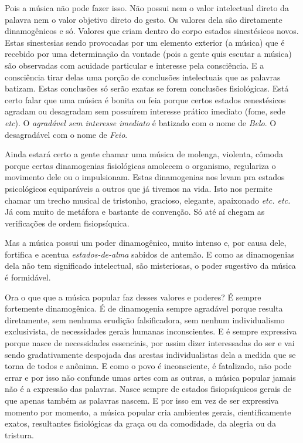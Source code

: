 Pois a música não pode fazer isso. Não possui nem o valor intelectual
direto da palavra nem o valor objetivo direto do gesto. Os valores dela
são diretamente dinamogênicos e só. Valores que criam dentro do corpo
estados sinestésicos novos. Estas sinestesias sendo provocadas por um
elemento exterior (a música) que é recebido por uma determinação da
vontade (pois a gente quis escutar a música) são observadas com acuidade
particular e interesse pela consciência. E a consciência tirar delas uma
porção de conclusões intelectuais que as palavras batizam. Estas
conclusões só serão exatas se forem conclusões fisiológicas. Está certo
falar que uma música é bonita ou feia porque certos estados cenestésicos
agradam ou desagradam sem possuírem interesse prático imediato (fome,
sede \textit{etc}). O \textit{agradável sem interesse imediato} é batizado com o nome de
\textit{Belo}. O desagradável com o nome de \textit{Feio}.

Ainda estará certo a gente chamar uma música de molenga, violenta,
cômoda porque certas dinamogenias fisiológicas amolecem o organismo,
regulariza o movimento dele ou o impulsionam. Estas dinamogenias nos
levam pra estados psicológicos equiparáveis a outros que já tivemos na
vida. Isto nos permite chamar um trecho musical de tristonho, gracioso,
elegante, apaixonado \textit{etc. etc.} Já com muito de metáfora e bastante de
convenção. Só até aí chegam as verificações de ordem fisiopsíquica.

Mas a música possui um poder dinamogênico, muito intenso e, por causa
dele, fortifica e acentua \textit{estados-de-alma} sabidos de antemão. E
como as dinamogenias dela não tem significado intelectual, são
misteriosas, o poder sugestivo da música é formidável.

Ora o que que a música popular faz desses valores e poderes? É sempre
fortemente dinamogênica. É de dinamogenia sempre agradável porque
resulta diretamente, sem nenhuma erudição falsificadora, sem nenhum
individualismo exclusivista, de necessidades gerais humanas
inconscientes. E é sempre expressiva porque nasce de necessidades
essenciais, por assim dizer interessadas do ser e vai sendo
gradativamente despojada das arestas individualistas dela a medida que
se torna de todos e anônima. E como o povo é inconsciente, é fatalizado,
não pode errar e por isso não confunde umas artes com as outras, a
música popular jamais não é a expressão das palavras. Nasce sempre de
estados fisiopsíquicos gerais de que apenas também as palavras
nascem. E por isso em vez de ser expressiva momento por momento, a
música popular cria ambientes gerais, cientificamente exatos,
resultantes fisiológicas da graça ou da comodidade, da alegria ou da
tristura.

